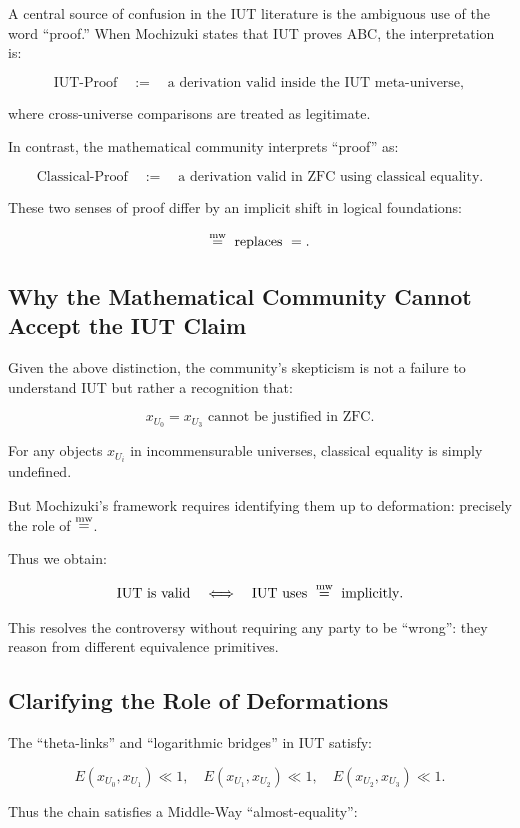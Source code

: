 \documentclass[11pt]{article}
\begin{document}
A central source of confusion in the IUT literature is the ambiguous use
of the word ``proof.'' When Mochizuki states that IUT proves ABC, the
interpretation is:

\[
\text{IUT-Proof} 
\quad:=\quad
\text{a derivation valid inside the IUT meta-universe},
\]

where cross-universe comparisons are treated as legitimate.

In contrast, the mathematical community interprets ``proof'' as:

\[
\text{Classical-Proof}
\quad:=\quad
\text{a derivation valid in ZFC using classical equality}.
\]

These two senses of proof differ by an implicit shift in logical
foundations:

\[
\mathrel{\overset{\mathrm{mw}}{=}} \text{ replaces } =.
\]

\subsection{Why the Mathematical Community Cannot Accept the IUT Claim}

Given the above distinction, the community's skepticism is not a failure
to understand IUT but rather a recognition that:

\[
x_{U_0} = x_{U_3} \text{ cannot be justified in ZFC}.
\]

For any objects $x_{U_i}$ in incommensurable universes, classical equality 
is simply undefined.

But Mochizuki’s framework requires identifying them up to deformation:
precisely the role of $\mathrel{\overset{\mathrm{mw}}{=}}$.

Thus we obtain:

\[
\text{IUT is valid} 
\quad \Longleftrightarrow \quad 
\text{IUT uses }\mathrel{\overset{\mathrm{mw}}{=}} \text{ implicitly}.
\]

This resolves the controversy without requiring any party to be “wrong”:
they reason from different equivalence primitives.

\subsection{Clarifying the Role of Deformations}

The ``theta-links'' and ``logarithmic bridges'' in IUT satisfy:

\[
E(x_{U_0}, x_{U_1}) \ll 1,\quad
E(x_{U_1}, x_{U_2}) \ll 1,\quad
E(x_{U_2}, x_{U_3}) \ll 1.
\]

Thus the chain satisfies a Middle-Way ``almost-equality'':
\end{document}
